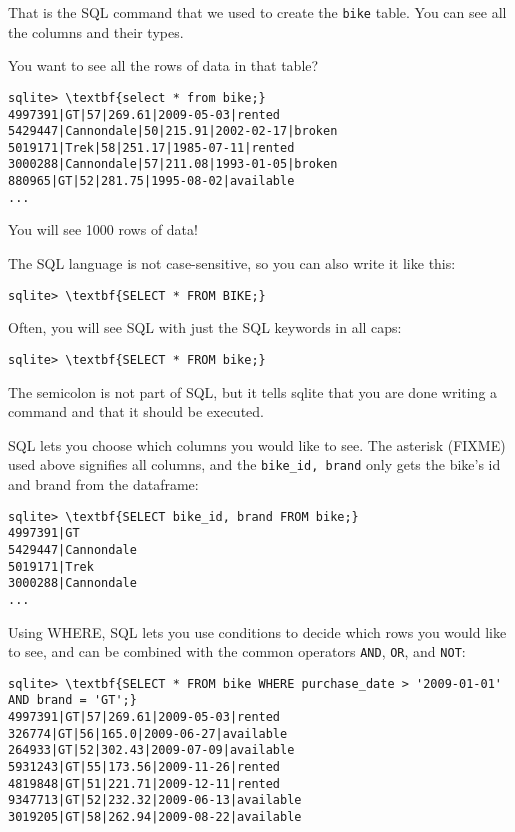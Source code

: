 That is the SQL command that we used to create the \texttt{bike}
table. You can see all the columns and their types.

You want to see all the rows of data in that table?

\begin{Verbatim}[commandchars=\\\{\}]
sqlite> \textbf{select * from bike;}
4997391|GT|57|269.61|2009-05-03|rented
5429447|Cannondale|50|215.91|2002-02-17|broken
5019171|Trek|58|251.17|1985-07-11|rented
3000288|Cannondale|57|211.08|1993-01-05|broken
880965|GT|52|281.75|1995-08-02|available
...
\end{Verbatim}

You will see 1000 rows of data!

The SQL language is not case-sensitive, so you can also write it like this:
\begin{Verbatim}[commandchars=\\\{\}]
sqlite> \textbf{SELECT * FROM BIKE;}  
\end{Verbatim}

Often, you will see SQL with just the SQL keywords in all caps:
\begin{Verbatim}[commandchars=\\\{\}]
sqlite> \textbf{SELECT * FROM bike;}  
\end{Verbatim}
The semicolon is not part of SQL, but it tells sqlite that you are done writing a command and that it should be executed.

SQL lets you choose which columns you would like to see. The asterisk (FIXME) used above signifies all columns, and the \verb|bike_id, brand| only gets the bike's id and brand from the dataframe:
\begin{Verbatim}[commandchars=\\\{\}]
sqlite> \textbf{SELECT bike_id, brand FROM bike;}
4997391|GT
5429447|Cannondale
5019171|Trek
3000288|Cannondale
...
\end{Verbatim}

Using WHERE, SQL lets you use conditions to decide which rows you would like to see, and can be combined with the common operators \verb|AND|, \verb|OR|, and \verb|NOT|:
\begin{Verbatim}[commandchars=\\\{\}]
sqlite> \textbf{SELECT * FROM bike WHERE purchase_date > '2009-01-01' AND brand = 'GT';}
4997391|GT|57|269.61|2009-05-03|rented
326774|GT|56|165.0|2009-06-27|available
264933|GT|52|302.43|2009-07-09|available
5931243|GT|55|173.56|2009-11-26|rented
4819848|GT|51|221.71|2009-12-11|rented
9347713|GT|52|232.32|2009-06-13|available
3019205|GT|58|262.94|2009-08-22|available  
\end{Verbatim}

